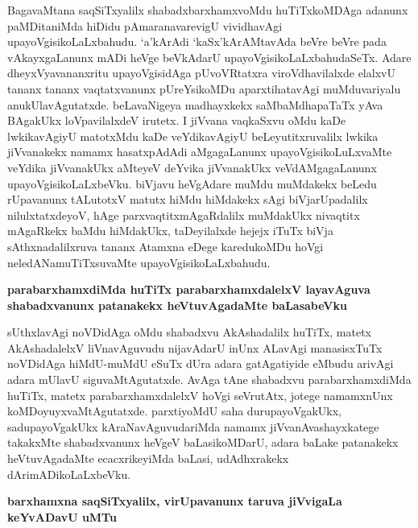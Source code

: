 \noindent
BagavaMtana saqSiTxyalilx shabadxbarxhamxvoMdu huTiTxkoMDAga adanunx paMDitaniMda hiDidu pAmaranavarevigU vividhavAgi upayoVgisikoLaLxbahudu. `a'kArAdi `kaSx'kArAMtavAda beVre beVre pada vAkayxgaLanunx mADi heVge beVkAdarU upayoVgisikoLaLxbahudaSeTx. Adare dheyxVyavananxritu upayoVgisidAga pUvoVRtatxra viroVdhavilalxde elalxvU tananx tananx vaqtatxvanunx pUreYsikoMDu aparxtihatavAgi muMduvariyalu anukUlavAgutatxde. beLavaNigeya madhayxkekx saMbaMdhapaTaTx yAva BAgakUkx loVpavilalxdeV irutetx. I jiVvana vaqkaSxvu oMdu kaDe lwkikavAgiyU matotxMdu kaDe veYdikavAgiyU beLeyutitxruvalilx lwkika jiVvanakekx namamx hasatxpAdAdi aMgagaLanunx upayoVgisikoLuLxvaMte veYdika jiVvanakUkx aMteyeV deYvika jiVvanakUkx veVdAMgagaLanunx upayoVgisikoLaLxbeVku. biVjavu heVgAdare muMdu muMdakekx beLedu rUpavanunx tALutotxV matutx hiMdu hiMdakekx sAgi biVjarUpadalilx nilulxtatxdeyoV, hAge parxvaqtitxmAgaRdalilx muMdakUkx nivaqtitx mAgaRkekx baMdu hiMdakUkx, taDeyilalxde hejejx iTuTx biVja sAthxnadalilxruva tananx Atamxna eDege karedukoMDu hoVgi neledANamuTiTxsuvaMte upayoVgisikoLaLxbahudu.

{\bigskip
\noindent
{\large\bf parabarxhamxdiMda huTiTx parabarxhamxdalelxV layavAguva shabadxvanunx patanakekx heVtuvAgadaMte baLasabeVku}}\label{page192}
\medskip

\noindent
sUthxlavAgi noVDidAga oMdu shabadxvu AkAshadalilx huTiTx, matetx AkAshadalelxV liVnavAguvudu nijavAdarU inUnx ALavAgi manasisxTuTx noVDidAga hiMdU-muMdU eSuTx dUra adara gatAgatiyide eMbudu arivAgi adara mUlavU siguvaMtAgutatxde. AvAga tAne shabadxvu parabarxhamxdiMda huTiTx, matetx parabarxhamxdalelxV hoVgi seVrutAtx, jotege namamxnUnx koMDoyuyxvaMtAgutatxde. parxtiyoMdU saha durupayoVgakUkx, sadupayoVgakUkx kAraNavAguvudariMda namamx jiVvanAvashayxkatege takakxMte shabadxvanunx heVgeV baLasikoMDarU, adara baLake patanakekx heVtuvAgadaMte ecacxrikeyiMda baLasi, udAdhxrakekx dArimADikoLaLxbeVku.

{\medskip
\noindent
{\large\bf barxhamxna saqSiTxyalilx, virUpavanunx taruva jiVvigaLa keYvADavU uMTu}}\label{page192a}
\medskip

